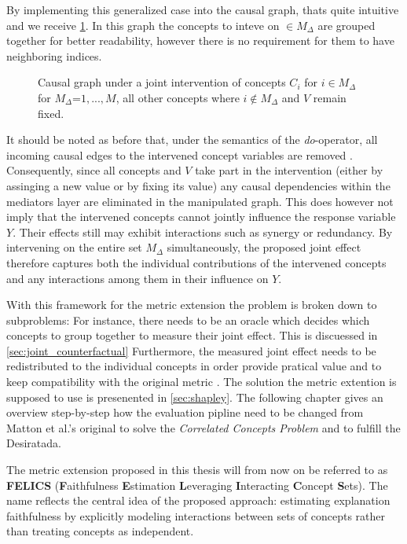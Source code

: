 By implementing this generalized case into the causal graph, thats quite intuitive and we receive \ref{fig:dgp_joint_intervened}. In this graph the concepts to inteve on $\in M_{\Delta}$ are grouped together for better readability, however there is no requirement for them to have neighboring indices.

\begin{figure}[ht]
\centering

\caption{Causal graph under a joint intervention of concepts $C_i$ for $i \in M_{\Delta}$ for $M_{\Delta}$=${1,...,M}$, all other concepts where $i\not\in M_{\Delta}$ and $V$ remain fixed.}
\label{fig:dgp_joint_intervened}
\end{figure}

It should be noted as before that, under the semantics of the \emph{do}-operator, all incoming causal edges to the intervened concept variables are removed \cite{pearlCausality2009}. Consequently, since all concepts and $V$ take part in the intervention (either by assinging a new value or by fixing its value) any causal dependencies within the mediators layer are eliminated in the manipulated graph. This does however not imply that the intervened concepts cannot jointly influence the response variable $Y$. Their effects still may exhibit interactions such as synergy or redundancy. By intervening on the entire set $M_{\Delta}$ simultaneously, the proposed joint effect therefore captures both the individual contributions of the intervened concepts and any interactions among them in their influence on $Y$.


With this framework for the metric extension the problem is broken down to subproblems: For instance, there needs to be an oracle which decides which concepts to group together to measure their joint effect. This is discuessed in \ref{sec:joint_counterfactual} Furthermore, the measured joint effect needs to be redistributed to the individual concepts in order provide pratical value and to keep compatibility with the original metric . The solution the metric extention is supposed to use is presenented in \ref{sec:shapley}. The following chapter gives an overview step-by-step how the evaluation pipline need to be changed from Matton et al.'s original to solve the \emph{Correlated Concepts Problem} and to fulfill the Desiratada.

The metric extension proposed in this thesis will from now on be referred to as \textbf{FELICS} (\textbf{F}aithfulness \textbf{E}stimation \textbf{L}everaging \textbf{I}nteracting \textbf{C}oncept \textbf{S}ets). The name reflects the central idea of the proposed approach: estimating explanation faithfulness by explicitly modeling interactions between sets of concepts rather than treating concepts as independent.

